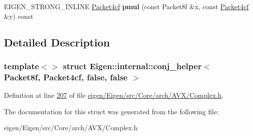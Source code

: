 \begin{DoxyCompactItemize}
\item 
\mbox{\label{struct_eigen_1_1internal_1_1conj__helper_3_01_packet8f_00_01_packet4cf_00_01false_00_01false_01_4_af1695348ea377eae0928a5d102e9fa73}} 
E\+I\+G\+E\+N\+\_\+\+S\+T\+R\+O\+N\+G\+\_\+\+I\+N\+L\+I\+NE \hyperlink{struct_eigen_1_1internal_1_1_packet4cf}{Packet4cf} {\bfseries pmul} (const Packet8f \&x, const \hyperlink{struct_eigen_1_1internal_1_1_packet4cf}{Packet4cf} \&y) const
\end{DoxyCompactItemize}


\subsection{Detailed Description}
\subsubsection*{template$<$$>$\newline
struct Eigen\+::internal\+::conj\+\_\+helper$<$ Packet8f, Packet4cf, false, false $>$}



Definition at line \hyperlink{eigen_2_eigen_2src_2_core_2arch_2_a_v_x_2_complex_8h_source_l00207}{207} of file \hyperlink{eigen_2_eigen_2src_2_core_2arch_2_a_v_x_2_complex_8h_source}{eigen/\+Eigen/src/\+Core/arch/\+A\+V\+X/\+Complex.\+h}.



The documentation for this struct was generated from the following file\+:\begin{DoxyCompactItemize}
\item 
eigen/\+Eigen/src/\+Core/arch/\+A\+V\+X/\+Complex.\+h\end{DoxyCompactItemize}
